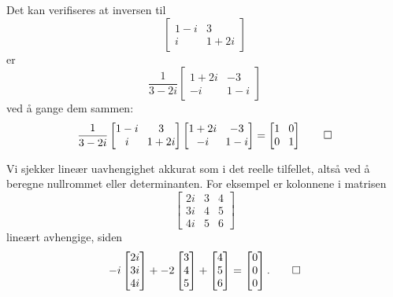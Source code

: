 \begin{ex}
Det kan verifiseres at inversen til 
\[
\begin{bmatrix}
1-i & 3  \\ i &1+2i 
\end{bmatrix}
\]
er
\[
\frac{1}{3-2i}
\begin{bmatrix}
1+2i & -3  \\ -i &1-i 
\end{bmatrix}
\]
ved å gange dem sammen:
\[
\frac{1}{3-2i}
\setlength\arraycolsep{4pt}
\begin{bmatrix}
1-i & 3  \\ i &1+2i 
\end{bmatrix}
\begin{bmatrix}
1+2i & -3  \\ -i &1-i 
\end{bmatrix}
=
\begin{bmatrix}
1 & 0  \\ 0 &1 
\end{bmatrix} \qedhere
\]


\end{ex}

\begin{ex}
Vi sjekker lineær uavhengighet akkurat som i det reelle tilfellet, altså ved å beregne nullrommet eller determinanten. For eksempel er kolonnene i matrisen 
\[
\begin{bmatrix}
2i & 3 & 4 \\ 3i & 4 & 5 \\ 4i &  5 &6  
\end{bmatrix}
\]
lineært avhengige, siden 
\[
-i
\begin{bmatrix}
2i  \\ 3i \\ 4i 
\end{bmatrix}
+
-2
\begin{bmatrix}
 3 \\  4  \\   5 
\end{bmatrix}
+
\begin{bmatrix}
 4 \\ 5 \\  6  
\end{bmatrix}
=
\begin{bmatrix}
0 \\ 0 \\ 0
\end{bmatrix}. \qedhere
\]
\end{ex}




